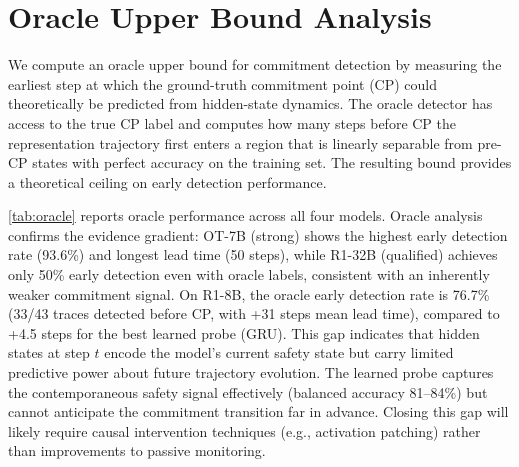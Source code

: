 \section{Oracle Upper Bound Analysis}
\label{sec:oracle}

We compute an oracle upper bound for commitment detection by measuring the earliest step at which the ground-truth commitment point (CP) could theoretically be predicted from hidden-state dynamics. The oracle detector has access to the true CP label and computes how many steps before CP the representation trajectory first enters a region that is linearly separable from pre-CP states with perfect accuracy on the training set. The resulting bound provides a theoretical ceiling on early detection performance.

\cref{tab:oracle} reports oracle performance across all four models. Oracle analysis confirms the evidence gradient: OT-7B (strong) shows the highest early detection rate (93.6\%) and longest lead time (50 steps), while R1-32B (qualified) achieves only 50\% early detection even with oracle labels, consistent with an inherently weaker commitment signal. On R1-8B, the oracle early detection rate is 76.7\% (33/43 traces detected before CP, with +31 steps mean lead time), compared to +4.5 steps for the best learned probe (GRU). This gap indicates that hidden states at step $t$ encode the model's current safety state but carry limited predictive power about future trajectory evolution. The learned probe captures the contemporaneous safety signal effectively (balanced accuracy 81--84\%) but cannot anticipate the commitment transition far in advance. Closing this gap will likely require causal intervention techniques (e.g., activation patching) rather than improvements to passive monitoring.

\begin{table}[htbp]
\centering
\small
\caption{Oracle upper bound analysis. Detection rate: fraction of traces where the oracle finds a linearly separable boundary before or at CP. Early detection rate: fraction detected before CP. Mean lead: average steps before CP at first detection.}
\label{tab:oracle}
\end{table}


